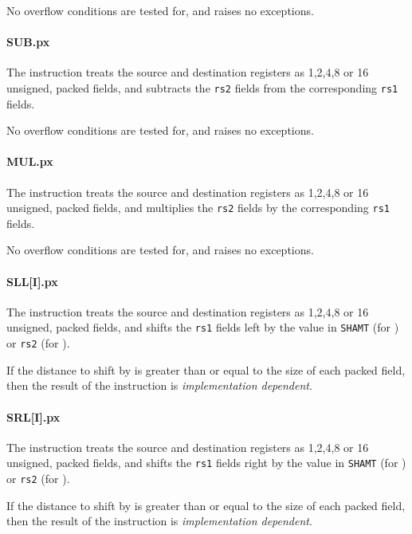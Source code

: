 No overflow conditions are tested for, and  raises no exceptions.

\paragraph{SUB.px}

The instruction  treats the source and destination registers as
1,2,4,8 or 16 unsigned, packed fields, and subtracts the {\tt rs2} fields
from the corresponding {\tt rs1} fields.

No overflow conditions are tested for, and  raises no exceptions.

\paragraph{MUL.px}

The instruction  treats the source and destination registers as
1,2,4,8 or 16 unsigned, packed fields, and multiplies the {\tt rs2} fields
by the corresponding {\tt rs1} fields.

No overflow conditions are tested for, and  raises no exceptions.

\paragraph{SLL[I].px}

The instruction  treats the source and destination registers as
1,2,4,8 or 16 unsigned, packed fields, and shifts the {\tt rs1} fields
left by the value in {\tt SHAMT} (for ) or {\tt rs2} 
(for ).

If the distance to shift by is greater than or equal to the size of each
packed field, then the result of the  instruction is
{\em implementation dependent}.

\paragraph{SRL[I].px}

The instruction  treats the source and destination registers as
1,2,4,8 or 16 unsigned, packed fields, and shifts the {\tt rs1} fields
right by the value in {\tt SHAMT} (for ) or {\tt rs2} 
(for ).

If the distance to shift by is greater than or equal to the size of each
packed field, then the result of the  instruction is
{\em implementation dependent}.

